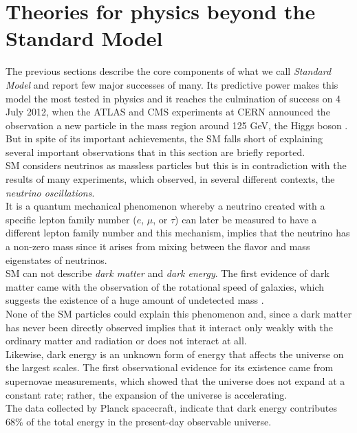 \newpage
\section{Theories for physics beyond the Standard Model}
\label{sec:bsm}
The previous sections describe the core components of what we call \textit{Standard Model} and report few major successes of many. 
Its predictive power makes this model the most tested in physics and it reaches the culmination of success on 4 July 2012, when
the ATLAS and CMS experiments at CERN announced the observation a new particle in the mass region around 125 GeV, the
Higgs boson \cite{higgsDiscovery}. \\
But in spite of its important achievements, the SM falls short of explaining several important observations that in this section
are briefly reported.
\vspace{\baselineskip}
\\SM considers neutrinos as massless particles but this is in contradiction with the results of many experiments, which observed,
in several different contexts, the \textit{neutrino oscillations}. \\
It is a quantum mechanical phenomenon whereby a neutrino created with a specific lepton family number ($e$, $\mu$, or $\tau$) 
can later be measured to have a different lepton family number and this mechanism, implies that the neutrino has a non-zero mass 
since it arises from mixing between the flavor and mass eigenstates of neutrinos. 
\vspace{\baselineskip}
\\SM can not describe \textit{dark matter} and \textit{dark energy}. The first evidence of dark matter came with the observation of 
the rotational speed of galaxies, which suggests the existence of a huge amount of undetected mass \cite{zwicky}.\\
None of the SM particles could explain this phenomenon and, since a dark matter has never been directly observed implies that
it interact only weakly with the ordinary matter and radiation or does not interact at all.\\
Likewise, dark energy is an unknown form of energy that affects the universe on the largest scales.
The first observational evidence for its existence came from supernovae measurements, which showed that the universe does 
not expand at a constant rate; rather, the expansion of the universe is accelerating.\\
The data collected by Planck spacecraft, indicate that dark energy contributes  68\% of the total energy in the present-day observable universe. 

